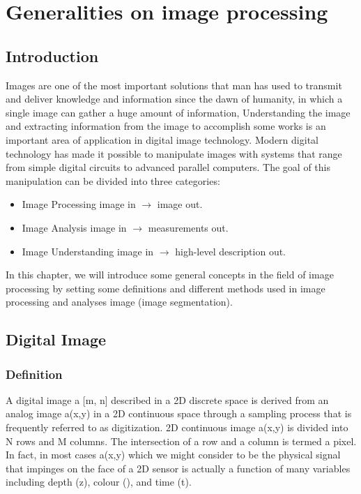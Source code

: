 \pagestyle{fancy}
\chapter{Generalities on image processing}\label{ch:generalities-on-image-processing}
\chead{}
\lhead{\bfseries \chaptername {\,} \thechapter }
\cfoot{\bfseries \thepage}
\rhead{}

\section{Introduction}\label{sec:introduction-ch1}
\hspace{1cm}Images are one of the most important solutions that man has used to transmit and deliver knowledge and information since the dawn of humanity, in which a single image can gather a huge amount of information, Understanding the image and extracting information from the image to accomplish some works is an important area of application in digital image technology.
Modern digital technology has made it possible to manipulate images with systems that range from simple digital circuits to advanced parallel computers. The goal of this manipulation can be divided into three categories:
\begin{itemize}
        \item Image Processing\hspace{2cm} image in $\rightarrow$ image out.
        \item Image Analysis\hspace{2.4cm} image in $\rightarrow$ measurements out.
        \item Image Understanding\hspace{1.3cm} image in $\rightarrow$ high-level description out.
\end{itemize}
\hspace{1cm}In this chapter, we will introduce some general concepts in the field of image processing by setting some definitions and different methods used in image processing and analyses image (image segmentation).


\section{Digital Image}\label{sec:Digital-Image}
\subsection{Definition}
\hspace{1cm}A digital image a [m, n] described in a 2D discrete space is derived from an analog image a(x,y) in a 2D continuous space through a sampling process that is frequently referred to as digitization.
2D continuous image a(x,y) is divided into N rows and M columns.
The intersection of a row and a column is termed a pixel.
In fact, in most cases a(x,y) which we might consider to be the physical signal that impinges on the face of a 2D sensor is actually a function of many variables including depth (z), colour (), and time (t).

